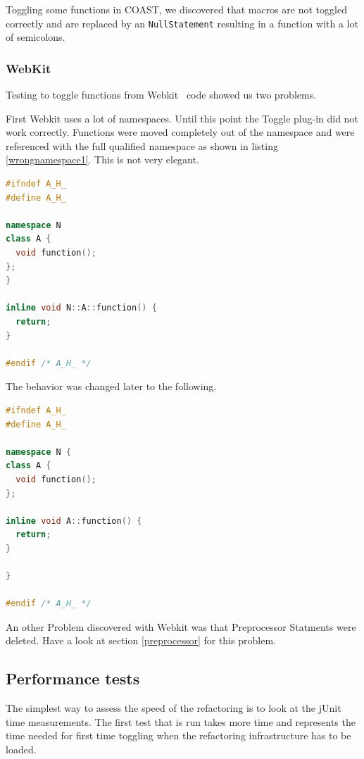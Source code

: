 Toggling some functions in COAST, we discovered that macros are not toggled
correctly and are replaced by an \texttt{NullStatement} resulting in a function
with a lot of semicolons.

\subsubsection{WebKit}
Testing to toggle functions from Webkit~\cite{Webkit} code showed us two
problems.

First Webkit uses a lot of namespaces. Until this point the Toggle
plug-in did not work correctly. Functions were moved completely out of the
namespace and were referenced with the full qualified namespace as shown in
listing \ref{wrongnamespace1}. This is not very elegant.

\begin{lstlisting}[caption={\texttt{function()} with reference to fully
qualified namespace}, label={wrongnamespace1}, language=C++]
#ifndef A_H_
#define A_H_

namespace N
class A {
  void function();
};
}

inline void N::A::function() {
  return;
}

#endif /* A_H_ */
\end{lstlisting}

The behavior was changed later to the following.

\begin{lstlisting}[caption={A.h, function definition in namespace},
label={wrongnamespace2}, language=C++]
#ifndef A_H_
#define A_H_

namespace N {
class A {
  void function();
};

inline void A::function() {
  return;
}

}

#endif /* A_H_ */
\end{lstlisting}

An other Problem discovered with Webkit was that Preprocessor Statments were
deleted. Have a look at section \ref{preprocessor} for this problem.

\subsection{Performance tests}

The simplest way to assess the speed of the refactoring is to look at the jUnit 
time measurements. The first test that is run takes more time and represents the 
time needed for first time toggling when the refactoring infrastructure has to 
be loaded. 

